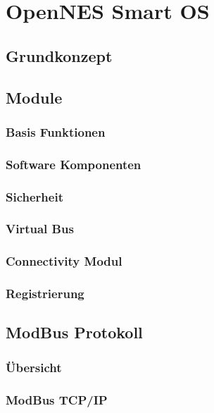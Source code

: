 \chapter{OpenNES Smart OS}
\thispagestyle{standard}
\pagestyle{standard}


\section{Grundkonzept}

\section{Module}


\subsection{Basis Funktionen}




\subsection{Software Komponenten}




\subsection{Sicherheit}





\subsection{Virtual Bus}





\subsection{Connectivity Modul}





\subsection{Registrierung}






\section{ModBus Protokoll}






\subsection{Übersicht}





\subsection{ModBus TCP/IP}











